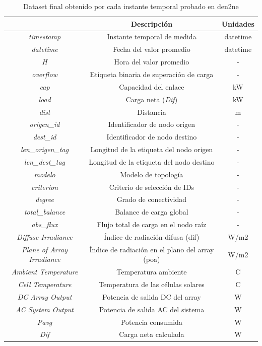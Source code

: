 \begin{table}[h!]
    \centering
    \begin{tabular}{|c|c|c|}
    \hline
    \rowcolor[HTML]{AAAAAA} 
    \multicolumn{1}{|c|}{\cellcolor[HTML]{AAAAAA}Campo} & \multicolumn{1}{c|}{\cellcolor[HTML]{AAAAAA}Descripción} & Unidades \\ \hline
    \textit{timestamp} & Instante temporal de medida & datetime \\ \hline
    \textit{datetime} & Fecha del valor promedio & datetime \\ \hline
    \textit{H} & Hora del valor promedio & - \\ \hline
    \textit{overflow} & Etiqueta binaria de superación de carga & - \\ \hline
    \textit{cap} & Capacidad del enlace & kW \\ \hline
    \textit{load} & Carga neta (\textit{Dif}) & kW \\ \hline
    \textit{dist} & Distancia & m \\ \hline
    \textit{origen\_id} & Identificador de nodo origen & - \\ \hline
    \textit{dest\_id} & Identificador de nodo destino & - \\ \hline
    \textit{len\_origen\_tag} & Longitud de la etiqueta del nodo origen & - \\ \hline
    \textit{len\_dest\_tag} & Longitud de la etiqueta del nodo destino & - \\ \hline
    \textit{modelo} & Modelo de topología & - \\ \hline
    \textit{criterion} & Criterio de selección de IDs & - \\ \hline
    \textit{degree} & Grado de conectividad & - \\ \hline
    \textit{total\_balance} & Balance de carga global & - \\ \hline
    \textit{abs\_flux} & Flujo total de carga en el nodo raíz & - \\ \hline
    \textit{Diffuse Irradiance} & Índice de radiación difusa (\gls{dif}) & W/m2 \\ \hline
    \textit{Plane of Array Irradiance} & Índice de radiación en el plano del array (\acrshort{poa}) & W/m2 \\ \hline 
    \textit{Ambient Temperature} & Temperatura ambiente & C \\ \hline
    \textit{Cell Temperature} & Temperatura de las células solares & C \\ \hline
    \textit{DC Array Output} & Potencia de salida DC del array & W \\ \hline
    \textit{AC System Output} & Potencia de salida AC del sistema & W \\ \hline
    \textit{Pavg} & Potencia consumida & W \\ \hline
    \textit{Dif} & Carga neta calculada & W \\ \hline
    \end{tabular}  
    \caption{Dataset final obtenido por cada instante temporal probado en \acrshort{den2ne}}
    \label{tab:datafinal}
\end{table}


